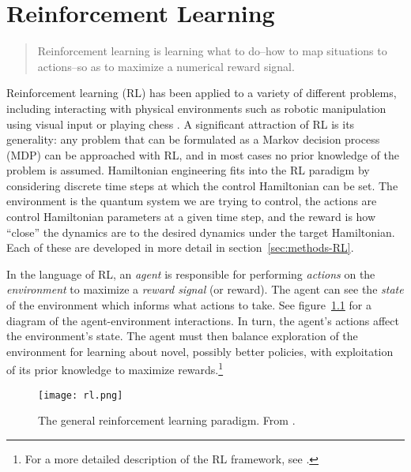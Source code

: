 
\chapter{Reinforcement Learning}



\begin{quote}
    Reinforcement learning is learning what to do--how to map situations to actions--so as to maximize a numerical reward signal. \cite{sutton2018reinforcement}
\end{quote}
Reinforcement learning  (RL) has been applied to a variety of different problems, including interacting with physical environments such as robotic manipulation using visual input \cite{lillicrap2015continuous} or playing chess \cite{Silver1140}. A significant attraction of RL is its generality: any problem that can be formulated as a Markov decision process (MDP) can be approached with RL, and in most cases no prior knowledge of the problem is assumed.
Hamiltonian engineering
fits into
the RL paradigm by considering discrete time steps at which the control Hamiltonian can be set.
The environment is the quantum system we are trying to control, the actions are control Hamiltonian parameters at a given time step,
and the reward is how ``close'' the dynamics are to the desired dynamics under the target Hamiltonian. Each of these are developed in more detail in section~\ref{sec:methods-RL}.

In the language of RL, an \emph{agent} is responsible for performing \emph{actions} on the \emph{environment} to maximize a \emph{reward signal} (or reward). The agent can see the \emph{state} of the environment which informs what actions to take. See figure~\ref{fig:RL} for a diagram of the agent-environment interactions. In turn, the agent's actions affect the environment's state. The agent must then balance exploration of the environment for learning about novel, possibly better policies, with exploitation of its prior knowledge to maximize rewards.\footnote{
For a more detailed description of the RL framework, see \cite{sutton2018reinforcement}.
}

\begin{figure}[H]
    \centering
    \texttt{[image: rl.png]}
    \caption{The general reinforcement learning paradigm. From \cite{sutton2018reinforcement}.}
    \label{fig:RL}
\end{figure}

